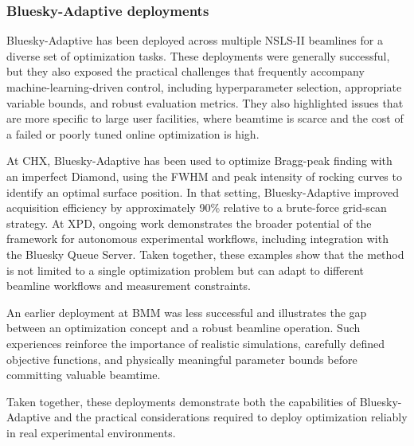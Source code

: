 \subsubsection{Bluesky-Adaptive deployments}
Bluesky-Adaptive has been deployed across multiple NSLS-II beamlines for a diverse set of optimization tasks.
These deployments were generally successful, but they also exposed the practical challenges that
frequently accompany machine-learning-driven control, including hyperparameter selection,
appropriate variable bounds, and robust evaluation metrics. They also highlighted issues that are
more specific to large user facilities, where beamtime is scarce and the cost of a failed or poorly
tuned online optimization is high.

At CHX, Bluesky-Adaptive has been used to optimize Bragg-peak finding with an imperfect Diamond, using the
FWHM and peak intensity of rocking curves to identify an optimal surface position. In that
setting, Bluesky-Adaptive improved acquisition efficiency by approximately 90\% relative to a brute-force
grid-scan strategy. At XPD, ongoing work demonstrates the broader potential of the framework for
autonomous experimental workflows, including integration with the Bluesky Queue Server. Taken
together, these examples show that the method is not limited to a single optimization problem but
can adapt to different beamline workflows and measurement constraints.

An earlier deployment at BMM was less successful and illustrates the gap between an optimization
concept and a robust beamline operation. Such experiences reinforce the importance of realistic
simulations, carefully defined objective functions, and physically meaningful parameter bounds
before committing valuable beamtime.

Taken together, these deployments demonstrate both the capabilities of Bluesky-Adaptive and the practical
considerations required to deploy optimization reliably in real experimental environments. 